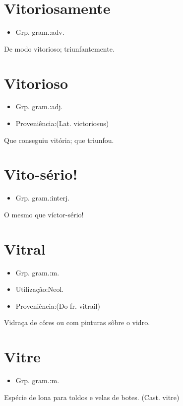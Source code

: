 \documentclass{article}
\begin{document}
\section{Vitoriosamente}
\begin{itemize}
\item {Grp. gram.:adv.}
\end{itemize}
De modo vitorioso; triunfantemente.
\section{Vitorioso}
\begin{itemize}
\item {Grp. gram.:adj.}
\end{itemize}
\begin{itemize}
\item {Proveniência:(Lat. \textunderscore victoriosus\textunderscore )}
\end{itemize}
Que conseguiu vitória; que triunfou.
\section{Vito-sério!}
\begin{itemize}
\item {Grp. gram.:interj.}
\end{itemize}
O mesmo que \textunderscore víctor-sério!\textunderscore 
\section{Vitral}
\begin{itemize}
\item {Grp. gram.:m.}
\end{itemize}
\begin{itemize}
\item {Utilização:Neol.}
\end{itemize}
\begin{itemize}
\item {Proveniência:(Do fr. \textunderscore vitrail\textunderscore )}
\end{itemize}
Vidraça de côres ou com pinturas sôbre o vidro.
\section{Vitre}
\begin{itemize}
\item {Grp. gram.:m.}
\end{itemize}
Espécie de lona para toldos e velas de botes.
(Cast. \textunderscore vitre\textunderscore )
\end{document}
